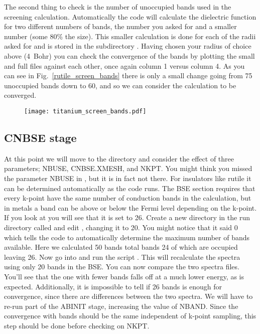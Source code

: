 \documentclass[11pt]{report}
\begin{document}
The second thing to check is the number of unoccupied bands used in the screening calculation. Automatically the code will calculate the dielectric function for two different numbers of bands, the number you asked for and a smaller number (some 80\% the size). This smaller calculation is done for each of the radii asked for and is stored in the subdirectory . Having chosen your radius of choice above (4~Bohr) you can check the convergence of the bands by plotting the small and full  files against each other, once again column 1 versus column 4. As you can see in Fig.\ \ref{rutile_screen_bands} there is only a small change going from 75 unoccupied bands down to 60, and so we can consider the calculation to be converged.

\begin{figure}
\texttt{[image: titanium\_screen\_bands.pdf]}
\label{titanium_screen_bands}
\end{figure}


\subsection{CNBSE stage}

At this point we will move to the  directory and consider the effect of three parameters; NBUSE, CNBSE.XMESH, and NKPT. You might think you missed the parameter NBUSE in , but it is in fact not there. For insulators like rutile it can be determined automatically as the code runs. The BSE section requires that every k-point have the same number of conduction bands in the calculation, but in metals a band can be above or below the Fermi level depending on the k-point. If you look at  you will see that it is set to 26. Create a new directory in the run directory called  and edit , changing it to 20. You might notice that it said 0 which tells the code to automatically determine the maximum number of bands available. Here we calculated 50 bands total bands 24 of which are occupied leaving 26. Now go into  and run the script . This will recalculate the spectra using only 20 bands in the BSE. You can now compare the two spectra files. You'll see that the one with fewer bands falls off at a much lower energy, as is expected. Additionally, it is impossible to tell if 26 bands is enough for convergence, since there are differences between the two spectra. We will have to re-run part of the ABINIT stage, increasing the value of NBAND. Since the convergence with bands should be the same independent of k-point sampling, this step should be done before checking on NKPT.
\end{document}
